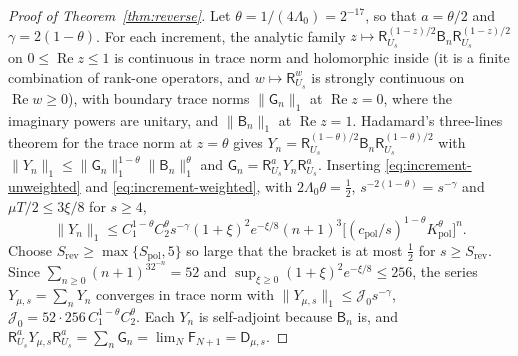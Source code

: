 \documentclass[aps,prl,reprint,longbibliography,raggedbottom]{revtex4-2}
\newcommand{\norm}[1]{\lVert #1\rVert}
\DeclareMathOperator{\Rea}{Re}
\newcommand{\Res}{\mathsf R}
\newcommand{\JointRes}{\Res_{U_s}}
\newcommand{\JointD}{\mathsf D}
\begin{document}
\begin{proof}[Proof of Theorem~\ref{thm:reverse}]
Let $\theta=1/(4\Lambda_0)=2^{-17}$, so that $a=\theta/2$ and
$\gamma=2(1-\theta)$. For each increment, the analytic family
$z\mapsto\JointRes^{(1-z)/2}\mathsf B_n\JointRes^{(1-z)/2}$ on
$0\le\Rea z\le1$ is continuous in trace norm and holomorphic inside
(it is a finite combination of rank-one operators, and
$w\mapsto\JointRes^w$ is strongly continuous on $\Rea w\ge0$), with
boundary trace norms $\norm{\mathsf G_n}_1$ at $\Rea z=0$, where the
imaginary powers are unitary, and $\norm{\mathsf B_n}_1$ at $\Rea z=1$. Hadamard's
three-lines theorem for the trace norm \cite{Simon05} at $z=\theta$
gives
$Y_n=\JointRes^{(1-\theta)/2}\mathsf B_n\JointRes^{(1-\theta)/2}$ with
$\norm{Y_n}_1\le\norm{\mathsf G_n}_1^{1-\theta}\norm{\mathsf B_n}_1^\theta$ and
$\mathsf G_n=\JointRes^aY_n\JointRes^a$. Inserting
\eqref{eq:increment-unweighted} and \eqref{eq:increment-weighted}, with
$2\Lambda_0\theta=\frac12$, $s^{-2(1-\theta)}=s^{-\gamma}$ and
$\mu T/2\le3\xi/8$ for $s\ge4$,
\[
\norm{Y_n}_1\le C_1^{1-\theta}C_2^\theta s^{-\gamma}(1+\xi)^2e^{-\xi/8}
(n+1)^3\bigl[(c_{\mathrm{pol}}/s)^{1-\theta}K_{\mathrm{pol}}^\theta\bigr]^n .
\]
Choose $S_{\mathrm{rev}}\ge\max\{S_{\mathrm{pol}},5\}$ so large that
the bracket is at most $\frac12$ for $s\ge S_{\mathrm{rev}}$. Since
$\sum_{n\ge0}(n+1)^32^{-n}=52$ and $\sup_{\xi\ge0}(1+\xi)^2e^{-\xi/8}\le256$,
the series $Y_{\mu,s}=\sum_nY_n$ converges in trace norm with
$\norm{Y_{\mu,s}}_1\le\mathcal J_0s^{-\gamma}$,
$\mathcal J_0=52\cdot256\,C_1^{1-\theta}C_2^\theta$. Each $Y_n$ is
self-adjoint because $\mathsf B_n$ is, and
$\JointRes^aY_{\mu,s}\JointRes^a=\sum_n\mathsf G_n=\lim_N\mathsf F_{N+1}=\JointD_{\mu,s}$.
\end{proof}

\raggedright
\def\UrlNoBreaks{\do\(\do\[\do\{\do\<\do\:}\mathchardef{}\relax

\end{document}
